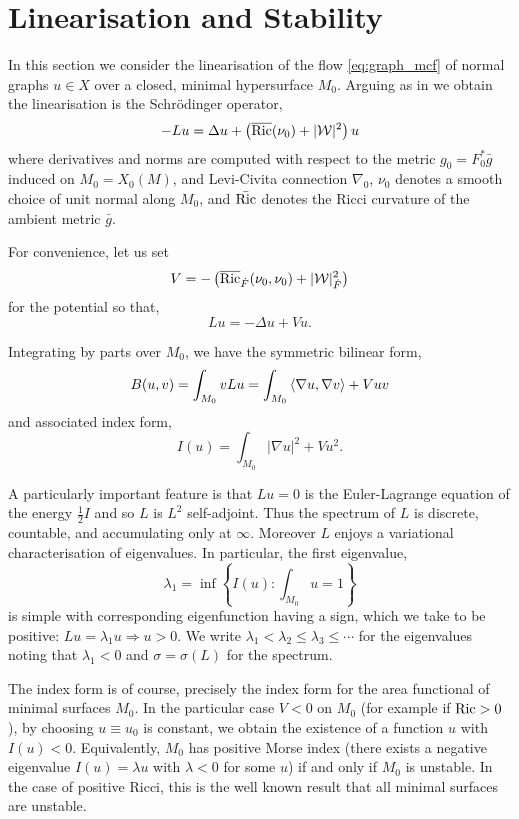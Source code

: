 \documentclass{amsart}
\begin{document}
\section{Linearisation and Stability}
\label{sec:linearising_linearisation}

In this section we consider the linearisation of the flow \eqref{eq:graph_mcf} of normal graphs \(u \in X\) over a closed, minimal hypersurface \(M_0\). Arguing as in \cite[Lemmas 3.1, 3,2, 3.5]{Harltey:/2016} we obtain the linearisation is the Schr\"odinger operator,
\begin{equation}
\label{eq:linearisation}
-L u = \Delta u + \left(\overline{\operatorname{Ric}}(\nu_0) + |\mathcal{W}|^2\right) u
\end{equation}
where derivatives and norms are computed with respect to the metric \(g_0 = F_0^{\ast} \bar{g}\) induced on \(M_0 = X_0(M)\), and Levi-Civita connection \(\nabla_0\), \(\nu_0\) denotes a smooth choice of unit normal along \(M_0\), and \(\bar{\operatorname{Ric}}\) denotes the Ricci curvature of the ambient metric \(\bar{g}\).

For convenience, let us set
\[
V = -\left(\overline{\operatorname{Ric}}_{\dot{F}}(\nu_0, \nu_0) + |\mathcal{W}|_{\dot{F}}^2\right)
\]
for the potential so that,
\[
L u = -\Delta u + V u.
\]

Integrating by parts over \(M_0\), we have the symmetric bilinear form,
\[
B(u, v) = \int_{M_0} v Lu = \int_{M_0} \left\langle \nabla u,\nabla v \right\rangle + V uv 
\]
and associated index form,
\[
I(u) = \int_{M_0} |\nabla u|^2 + V u^2.
\]

A particularly important feature is that $L u = 0$ is the Euler-Lagrange equation of the energy \(\tfrac{1}{2} I\) and so \(L\) is $L^2$ self-adjoint. Thus the spectrum of \(L\) is discrete, countable, and accumulating only at \(\infty\). Moreover \(L\) enjoys a variational characterisation of eigenvalues. In particular, the first eigenvalue,
\[
\lambda_1 = \inf \left\{I(u) : \int_{M_0} u = 1\right\}
\]
is simple with corresponding eigenfunction having a sign, which we take to be positive: \(Lu = \lambda_1 u \Rightarrow u > 0\). We write \(\lambda_1 < \lambda_2 \leq \lambda_3 \leq \cdots\) for the eigenvalues noting that \(\lambda_1 < 0\) and \(\sigma = \sigma(L)\) for the spectrum.

The index form is of course, precisely the index form for the area functional of minimal surfaces \(M_0\). In the particular case \(V < 0\) on \(M_0\) (for example if \(\operatorname{Ric} > 0\)), by choosing \(u \equiv u_0\) is constant, we obtain the existence of a function \(u\) with \(I(u) < 0\). Equivalently, \(M_0\) has positive Morse index (there exists a negative eigenvalue \(I(u) = \lambda u\) with \(\lambda < 0\) for some \(u\)) if and only if \(M_0\) is unstable. In the case of positive Ricci, this is the well known result that all minimal surfaces are unstable.
\end{document}
